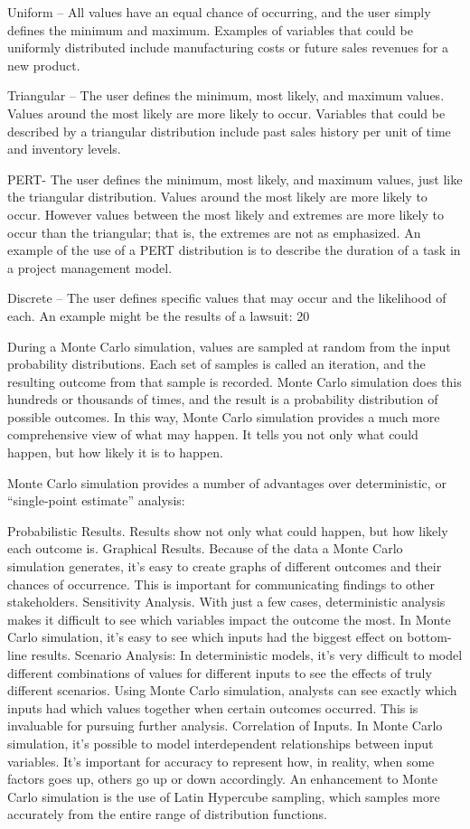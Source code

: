 Uniform – All values have an equal chance of occurring, and the user simply defines the minimum and maximum.  Examples of variables that could be uniformly distributed include manufacturing costs or future sales revenues for a new product.

Triangular – The user defines the minimum, most likely, and maximum values.  Values around the most likely are more likely to occur.  Variables that could be described by a triangular distribution include past sales history per unit of time and inventory levels.

PERT- The user defines the minimum, most likely, and maximum values, just like the triangular distribution.  Values around the most likely are more likely to occur.  However values between the most likely and extremes are more likely to occur than the triangular; that is, the extremes are not as emphasized.  An example of the use of a PERT distribution is to describe the duration of a task in a project management model.

Discrete – The user defines specific values that may occur and the likelihood of each.  An example might be the results of a lawsuit: 20%

During a Monte Carlo simulation, values are sampled at random from the input probability distributions.  Each set of samples is called an iteration, and the resulting outcome from that sample is recorded.  Monte Carlo simulation does this hundreds or thousands of times, and the result is a probability distribution of possible outcomes.  In this way, Monte Carlo simulation provides a much more comprehensive view of what may happen.  It tells you not only what could happen, but how likely it is to happen.

Monte Carlo simulation provides a number of advantages over deterministic, or “single-point estimate” analysis:

Probabilistic Results. Results show not only what could happen, but how likely each outcome is.
Graphical Results. Because of the data a Monte Carlo simulation generates, it’s easy to create graphs of different outcomes and their chances of occurrence.  This is important for communicating findings to other stakeholders.
Sensitivity Analysis. With just a few cases, deterministic analysis makes it difficult to see which variables impact the outcome the most.  In Monte Carlo simulation, it’s easy to see which inputs had the biggest effect on bottom-line results.
Scenario Analysis: In deterministic models, it’s very difficult to model different combinations of values for different inputs to see the effects of truly different scenarios.  Using Monte Carlo simulation, analysts can see exactly which inputs had which values together when certain outcomes occurred.  This is invaluable for pursuing further analysis.
Correlation of Inputs. In Monte Carlo simulation, it’s possible to model interdependent relationships between input variables.  It’s important for accuracy to represent how, in reality, when some factors goes up, others go up or down accordingly.
An enhancement to Monte Carlo simulation is the use of Latin Hypercube sampling, which samples more accurately from the entire range of distribution functions.
